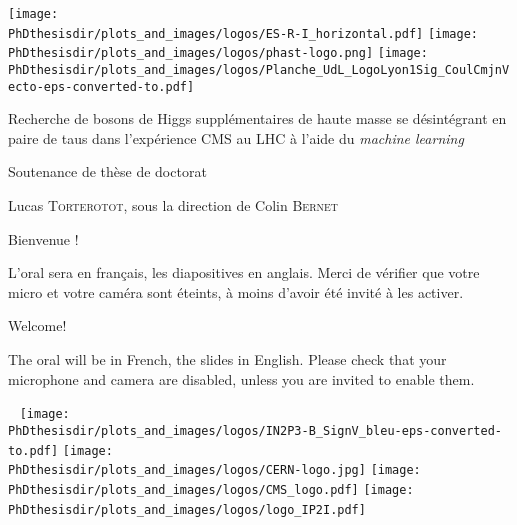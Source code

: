 \documentclass[10pt,aspectratio=169]{beamer}
\begin{document}
\begin{frame}[noframenumbering] \thispagestyle{empty}
\vspace{-.83cm}

\texttt{[image: \\PhDthesisdir/plots\_and\_images/logos/ES-R-I\_horizontal.pdf]}
\hfill
\texttt{[image: \\PhDthesisdir/plots\_and\_images/logos/phast-logo.png]}
\hfill
\texttt{[image: \\PhDthesisdir/plots\_and\_images/logos/Planche\_UdL\_LogoLyon1Sig\_CoulCmjnVecto-eps-converted-to.pdf]}

\vfill

\begin{center}
{\color{CERNblue}

{\large Recherche de bosons de Higgs supplémentaires de haute masse se désintégrant en paire de taus dans l'expérience CMS au LHC à l'aide du \emph{machine learning}}

Soutenance de thèse de doctorat}

\vfill

Lucas \textsc{Torterotot}, sous la direction de Colin \textsc{Bernet}
\end{center}

\vfill

\begin{minipage}[c]{.49\textwidth}
{\large\color{CERNblue}Bienvenue !}

\manip L'oral sera en français, les diapositives en anglais.
\manip Merci de vérifier que votre micro et votre caméra sont éteints, à moins d'avoir été invité à les activer.
\end{minipage}
\hfill
\begin{minipage}[c]{.49\textwidth}
{\large\color{CERNblue}Welcome!}

\manip The oral will be in French, the slides in English.
\manip Please check that your microphone and camera are disabled, unless you are invited to enable them.
\end{minipage}

\vfill

~ \hfill
\texttt{[image: \\PhDthesisdir/plots\_and\_images/logos/IN2P3-B\_SignV\_bleu-eps-converted-to.pdf]}
\hfill
\texttt{[image: \\PhDthesisdir/plots\_and\_images/logos/CERN-logo.jpg]}
\hfill
\texttt{[image: \\PhDthesisdir/plots\_and\_images/logos/CMS\_logo.pdf]}
\hfill
\texttt{[image: \\PhDthesisdir/plots\_and\_images/logos/logo\_IP2I.pdf]}
\hfill ~

\vspace{-.5cm}
\end{frame}
\end{document}

